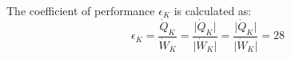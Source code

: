 The coefficient of performance \( \epsilon_K \) is calculated as:  
\[
\epsilon_K = \frac{\dot{Q}_K}{\dot{W}_K} = \frac{\lvert \dot{Q}_K \rvert}{\lvert \dot{W}_K \rvert} = \frac{\lvert \dot{Q}_K \rvert}{\lvert \dot{W}_K \rvert} = 28
\]